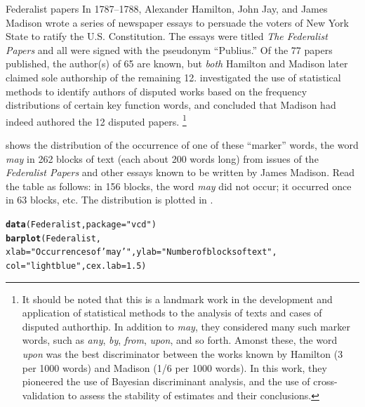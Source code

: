 \documentclass[11pt]{book}\usepackage[]{graphicx}\usepackage[]{color}
\makeatletter
\newcommand{\hlnum}[1]{\textcolor[rgb]{0.686,0.059,0.569}{#1}}%
\newcommand{\hlstr}[1]{\textcolor[rgb]{0.192,0.494,0.8}{#1}}%
\newcommand{\hlstd}[1]{\textcolor[rgb]{0.345,0.345,0.345}{#1}}%
\newcommand{\hlkwc}[1]{\textcolor[rgb]{0.333,0.667,0.333}{#1}}%
\newcommand{\hlkwd}[1]{\textcolor[rgb]{0.737,0.353,0.396}{\textbf{#1}}}%
\newenvironment{kframe}{%
 \def\at@end@of@kframe{}%
 \ifinner\ifhmode%
  \def\at@end@of@kframe{\end{minipage}}%
  \begin{minipage}{\columnwidth}%
 \fi\fi%
 \def\FrameCommand##1{\hskip\@totalleftmargin \hskip-\fboxsep
 \colorbox{shadecolor}{##1}\hskip-\fboxsep
     \hskip-\linewidth \hskip-\@totalleftmargin \hskip\columnwidth}%
 \MakeFramed {\advance\hsize-\width
   \@totalleftmargin\z@ \linewidth\hsize
   \@setminipage}}%
 {\par\unskip\endMakeFramed%
 \at@end@of@kframe}
\newenvironment{knitrout}{}{} %
\renewenvironment{knitrout}{\small\renewcommand{\baselinestretch}{.85}}{} %
\makeatother
\begin{document}
\begin{Example}[madison1]{Federalist papers}
In 1787--1788, Alexander Hamilton, John Jay, and James Madison
wrote a series of newspaper essays to persuade the voters of
New York State to ratify the U.S. Constitution.
The essays were titled \emph{The Federalist Papers}
and all were signed with the pseudonym ``Publius.''  Of the 77 papers published,
the author(s) of 65 are known, but \emph{both}
Hamilton and Madison later claimed sole authorship of the remaining 12.
\citet{MostellerWallace:63,MostellerWallace:84}
investigated the use of statistical methods to identify authors of
disputed works based on the frequency distributions of certain key
function words, and concluded that Madison had indeed authored the
12 disputed papers.%
\footnote{
It should be noted that this is a landmark work in the development and
application of statistical methods to the analysis of texts and
cases of disputed authorthip. In addition to
\emph{may}, they considered many such marker words,
such as \emph{any}, \emph{by}, \emph{from}, \emph{upon}, and so forth.
Amonst these, the word \emph{upon} was the best discriminator between
the works known by Hamilton (3 per 1000 words) and Madison (1/6 per 1000 words).
In this work, they pioneered the use of Bayesian discriminant analysis,
and the use of cross-validation to assess the stability of estimates
and their conclusions.
}

 shows the distribution of the occurrence of one of
these ``marker'' words, 
the
word \emph{may} in 262 blocks of text (each about 200 words long)
from issues of the \emph{Federalist Papers} and other essays known
to be written by James Madison.  Read the table as follows:
in 156 blocks, the word \emph{may}
did not occur; it occurred once in 63 blocks, etc.  The distribution
is plotted in .


\begin{knitrout}
\color{fgcolor}\begin{kframe}
\begin{alltt}
\hlkwd{data}\hlstd{(Federalist,} \hlkwc{package}\hlstd{=}\hlstr{"vcd"}\hlstd{)}
\hlkwd{barplot}\hlstd{(Federalist,}
        \hlkwc{xlab}\hlstd{=}\hlstr{"Occurrences of 'may'"}\hlstd{,} \hlkwc{ylab}\hlstd{=}\hlstr{"Number of blocks of text"}\hlstd{,}
        \hlkwc{col}\hlstd{=}\hlstr{"lightblue"}\hlstd{,} \hlkwc{cex.lab}\hlstd{=}\hlnum{1.5}\hlstd{)}
\end{alltt}
\end{kframe}\begin{figure}[htbp]



\end{figure}
\end{knitrout}
\end{Example}
\end{document}
